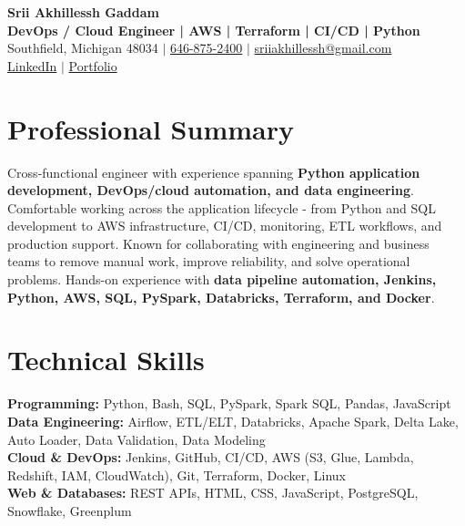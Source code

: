 \documentclass[letterpaper,10pt]{article}
\begin{document}
\fontsize{9.35pt}{10.45pt}\selectfont

\begin{center}
    {\LARGE \textbf{Srii Akhillessh Gaddam}} \\[-1pt]
    \textbf{DevOps / Cloud Engineer | AWS | Terraform | CI/CD | Python} \\[2pt]
    Southfield, Michigan 48034 $|$
    \href{tel:6468752400}{646-875-2400} $|$
    \href{mailto:sriiakhillessh@gmail.com}{sriiakhillessh@gmail.com} \\[1pt]
    \href{https://www.linkedin.com/in/srii-akhiilessh-gaddam-b48668191/}{LinkedIn} $|$
    \href{https://sriiakhillesshg.github.io/portfolio/}{Portfolio}
\end{center}
\vspace{-8pt}

\section{Professional Summary}
\small{Cross-functional engineer with experience spanning \textbf{Python application development, DevOps/cloud automation, and data engineering}. Comfortable working across the application lifecycle - from Python and SQL development to AWS infrastructure, CI/CD, monitoring, ETL workflows, and production support. Known for collaborating with engineering and business teams to remove manual work, improve reliability, and solve operational problems. Hands-on experience with \textbf{data pipeline automation, Jenkins, Python, AWS, SQL, PySpark, Databricks, Terraform, and Docker}.}

\section{Technical Skills}
\small{
\textbf{Programming:} Python, Bash, SQL, PySpark, Spark SQL, Pandas, JavaScript \\
\textbf{Data Engineering:} Airflow, ETL/ELT, Databricks, Apache Spark, Delta Lake, Auto Loader, Data Validation, Data Modeling \\
\textbf{Cloud \& DevOps:} Jenkins, GitHub, CI/CD, AWS (S3, Glue, Lambda, Redshift, IAM, CloudWatch), Git, Terraform, Docker, Linux \\
\textbf{Web \& Databases:} REST APIs, HTML, CSS, JavaScript, PostgreSQL, Snowflake, Greenplum
}
\end{document}
